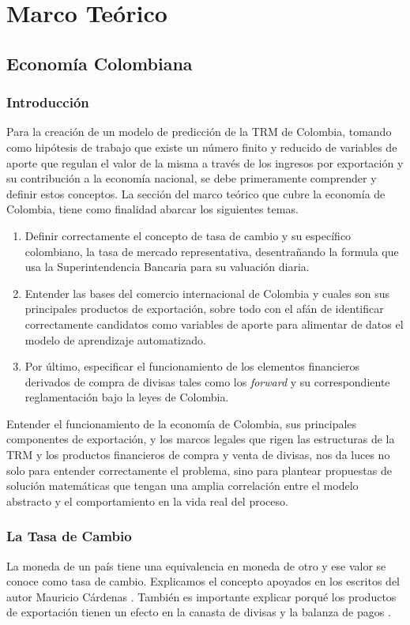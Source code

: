 \documentclass[letterpaper, spanish, 11pt]{report}
\begin{document}
\chapter{Marco Teórico}

\section{Economía Colombiana}

\subsection{Introducción}
Para la creación de un modelo de predicción de la TRM de Colombia, tomando como hipótesis de trabajo que existe un número finito y reducido de variables de aporte que regulan el valor de la misma a través de los ingresos por exportación y su contribución a la economía nacional, se debe primeramente comprender y definir estos conceptos. La sección del marco teórico que cubre la economía de Colombia, tiene como finalidad abarcar los siguientes temas.

\begin{enumerate}
	\item Definir correctamente el concepto de tasa de cambio y su específico colombiano, la tasa de mercado representativa, desentrañando la formula que usa la Superintendencia Bancaria para su valuación diaria.
	\item Entender las bases del comercio internacional de Colombia y cuales son sus principales productos de exportación, sobre todo con el afán de identificar correctamente candidatos como variables de aporte para alimentar de datos el modelo de aprendizaje automatizado.
	\item Por último, especificar el funcionamiento de los elementos financieros derivados de compra de divisas tales como los \emph{forward} y su correspondiente reglamentación bajo la leyes de Colombia.
\end{enumerate}

Entender el funcionamiento de la economía de Colombia, sus principales componentes de exportación, y los marcos legales que rigen las estructuras de la TRM y los productos financieros de compra y venta de divisas, nos da luces no solo para entender correctamente el problema, sino para plantear propuestas de solución matemáticas que tengan una amplia correlación entre el modelo abstracto y el comportamiento en la vida real del proceso.
\subsection{La Tasa de Cambio}
La moneda de un país tiene una equivalencia en moneda de otro y ese valor se conoce como tasa de cambio. Explicamos el concepto apoyados en los escritos del autor Mauricio Cárdenas \cite{cardenas}. También es importante explicar porqué los productos de exportación tienen un efecto en la canasta de divisas y la balanza de pagos \cite{crisisCambiarias}.
\end{document}
